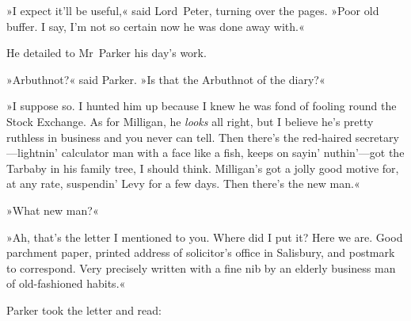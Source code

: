 »I expect it'll be useful,« said Lord~Peter, turning over the pages. »Poor old buffer. I say, I'm not so certain now he was done away with.«

He detailed to Mr~Parker his day's work.

»Arbuthnot?« said Parker. »Is that the Arbuthnot of the diary?«

»I suppose so. I hunted him up because I knew he was fond of fooling round the Stock Exchange. As for Milligan, he \textit{looks} all right, but I believe he's pretty ruthless in business and you never can tell. Then there's the red-haired secretary—lightnin' calculator man with a face like a fish, keeps on sayin' nuthin'---got the Tarbaby in his family tree, I should think. Milligan's got a jolly good motive for, at any rate, suspendin' Levy for a few days. Then there's the new man.«

»What new man?«

»Ah, that's the letter I mentioned to you. Where did I put it? Here we are. Good parchment paper, printed address of solicitor's office in Salisbury, and postmark to correspond. Very precisely written with a fine nib by an elderly business man of old-fashioned habits.«

Parker took the letter and read:

\begin{a4}
	\clearpage
\end{a4}


